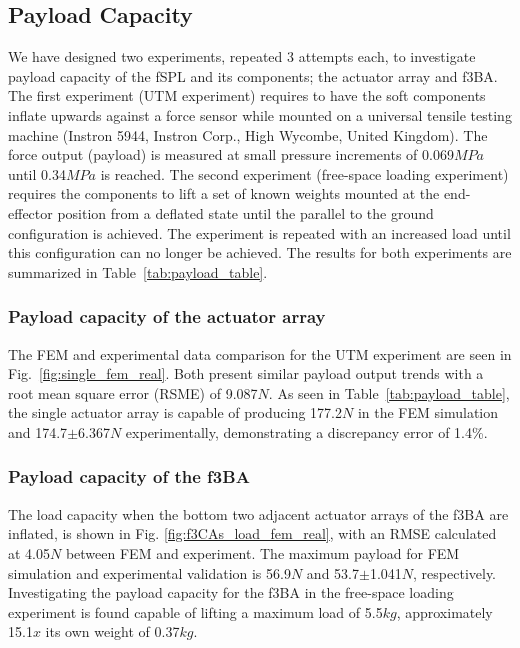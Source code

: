 \documentclass[letterpaper, 10 pt, conference]{ieeeconf}  %
\begin{document}
\subsection{Payload Capacity}

We have designed two experiments, repeated 3 attempts each, to investigate payload capacity of the fSPL and its components; the actuator array and f3BA. The first experiment (UTM experiment) requires to have the soft components inflate upwards against a force sensor while mounted on a universal tensile testing machine (Instron 5944, Instron Corp., High Wycombe, United Kingdom). The force output (payload) is measured at small pressure increments of 0.069$MPa$ until 0.34$MPa$ is reached. The second experiment (free-space loading experiment) requires the components to lift a set of known weights mounted at the end-effector position from a deflated state until the parallel to the ground configuration is achieved. The experiment is repeated with an increased load until this configuration can no longer be achieved. The results for both experiments are summarized in Table~\ref{tab:payload_table}.
% 

\subsubsection{Payload capacity of the actuator array}
\label{sec:act_array_fem_real}

The FEM and experimental data comparison for the UTM experiment are seen in Fig.~\ref{fig:single_fem_real}. Both present similar payload output trends with a root mean square error (RSME) of 9.087$N$. As seen in Table~\ref{tab:payload_table}, the single actuator array is capable of producing 177.2$N$ in the FEM simulation and 174.7$\pm$6.367$N$ experimentally, demonstrating a discrepancy error of 1.4\%.

\subsubsection{Payload capacity of the f3BA}

The load capacity when the bottom two adjacent actuator arrays of the f3BA are inflated, is shown in Fig. \ref{fig:f3CAs_load_fem_real}, with an RMSE calculated at 4.05$N$ between FEM and experiment. The maximum payload for FEM simulation and experimental validation is 56.9$N$ and 53.7$\pm$1.041$N$, respectively. Investigating the payload capacity for the f3BA in the free-space loading experiment is found capable of lifting a maximum load of 5.5$kg$, approximately 15.1$x$ its own weight of 0.37$kg$.
\end{document}
